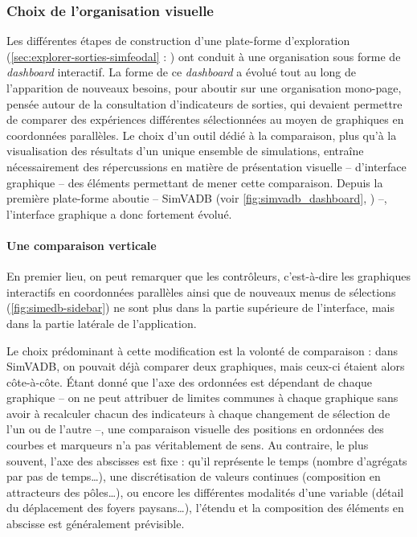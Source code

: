 \subsubsection{Choix de l'organisation visuelle}

Les différentes étapes de construction d'une plate-forme d'exploration (\cref{sec:explorer-sorties-simfeodal} : ) ont conduit à une organisation sous forme de \textit{dashboard} interactif.
La forme de ce \textit{dashboard} a évolué tout au long de l'apparition de nouveaux besoins, pour aboutir sur une organisation mono-page, pensée autour de la consultation d'indicateurs de sorties, qui devaient permettre de comparer des expériences différentes sélectionnées au moyen de graphiques en coordonnées parallèles.
Le choix d'un outil dédié à la comparaison, plus qu'à la visualisation des résultats d'un unique ensemble de simulations, entraîne nécessairement des répercussions en matière de présentation visuelle -- d'interface graphique -- des éléments permettant de mener cette comparaison.
Depuis la première plate-forme aboutie -- SimVADB (voir \cref{fig:simvadb_dashboard}, ) --, l'interface graphique a donc fortement évolué.

\paragraph*{Une comparaison verticale}

En premier lieu, on peut remarquer que les \og contrôleurs\fg{}, c'est-à-dire les graphiques interactifs en coordonnées parallèles ainsi que de nouveaux menus de sélections (\cref{fig:simedb-sidebar}) ne sont plus dans la partie supérieure de l'interface, mais dans la partie latérale de l'application.

Le choix prédominant à cette modification est la volonté de comparaison : dans SimVADB, on pouvait déjà comparer deux graphiques, mais ceux-ci étaient alors côte-à-côte.
Étant donné que l'axe des ordonnées est dépendant de chaque graphique -- on ne peut attribuer de limites communes à chaque graphique sans avoir à recalculer chacun des indicateurs à chaque changement de sélection de l'un ou de l'autre --, une comparaison visuelle des positions en ordonnées des courbes et marqueurs n'a pas véritablement de sens.
Au contraire, le plus souvent, l'axe des abscisses est fixe : qu'il représente le temps (nombre d'agrégats par pas de temps\ldots), une discrétisation de valeurs continues (composition en attracteurs des pôles\ldots), ou encore les différentes modalités d'une variable (détail du déplacement des foyers paysans\ldots), l'étendu et la composition des éléments en abscisse est généralement prévisible.

